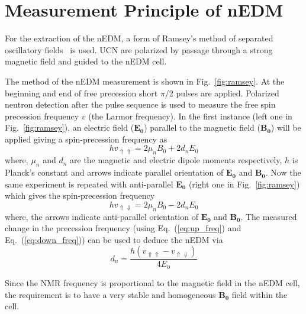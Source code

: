 \section{Measurement Principle of nEDM}\label{sec:nEDM}

For the extraction of the nEDM, a form of Ramsey's method of separated oscillatory fields~\cite{ramsey} is used. UCN are polarized by passage through a strong magnetic field and guided to the nEDM cell. 



The method of the nEDM measurement is shown in Fig.~\ref{fig:ramsey}. At the beginning and end of free precession short $\pi$/2 pulses are applied. Polarized neutron detection after the pulse sequence is used to measure the free spin precession frequency $v$ (the Larmor frequency). In the first instance (left one in Fig.~\ref{fig:ramsey}), an electric field ($\bm{E_0}$) parallel to the magnetic field ($\bm{B_0}$) will be applied giving a spin-precession frequency as
\begin{equation}\label{eq:up_freq}
    h v_{\Uparrow \Uparrow}=2\mu_n B_0+2 d_n E_0
\end{equation}
where, $\mu_n$ and $d_n$ are the magnetic and electric dipole moments respectively, $h$ is Planck's constant and arrows indicate parallel orientation of $\bm{E_0}$ and $\bm{B_0}$.
Now the same experiment is repeated with anti-parallel $\bm{E_0}$ (right one in Fig.~\ref{fig:ramsey}) which gives the spin-precession frequency
\begin{equation}\label{eq:down_freq}
    h v_{\Uparrow \Downarrow}=2\mu_n B_0-2 d_n E_0
\end{equation}
where, the arrows indicate anti-parallel orientation of $\bm{E_0}$ and $\bm{B_0}$.
The measured change in the precession frequency (using Eq.~(\ref{eq:up_freq}) and Eq.~(\ref{eq:down_freq})) can be used to deduce the nEDM via
\begin{equation}\label{eq:nEDM}
    d_n=\frac{h (v_{\Uparrow \Uparrow}-v_{\Uparrow \Downarrow})}{4 E_0}
\end{equation}

Since the NMR frequency is proportional to the magnetic field in the nEDM cell, the requirement is to have a very stable and homogeneous $\bm{B_0}$ field within the cell.


